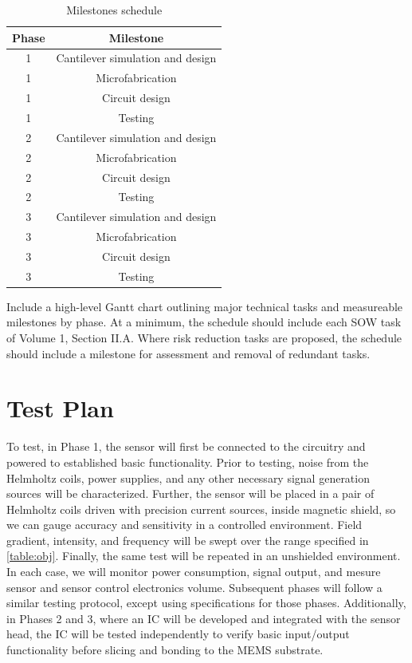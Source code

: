 \begin{table}[h!]
\centering
  \begin{tabular}{|c||c|}
    \hline
    Phase & Milestone \\
    \hline
    \hline
    1 & Cantilever simulation and design \\
    \hline
    1 & Microfabrication \\
    \hline
    1 & Circuit design \\
    \hline
    1 & Testing \\
    \hline
    \hline
    2 & Cantilever simulation and design \\
    \hline
    2 & Microfabrication \\
    \hline
    2 & Circuit design \\
    \hline
    2 & Testing \\
    \hline
    \hline
    3 & Cantilever simulation and design \\
    \hline
    3 & Microfabrication \\
    \hline
    3 & Circuit design \\
    \hline
    3 & Testing \\
    \hline
  \end{tabular}
\caption{Milestones schedule}
\label{table:sched}
\end{table}

Include a high-level Gantt chart outlining major technical tasks and measureable milestones
by phase. At a minimum, the schedule should include each SOW task of Volume 1, Section
II.A. Where risk reduction tasks are proposed, the schedule should include a milestone for
assessment and removal of redundant tasks.

\section{Test Plan}\label{sec:test}

To test, in Phase 1, the sensor will first be connected to the circuitry and powered to established basic functionality.  Prior to testing, noise from the Helmholtz coils, power supplies, and any other necessary signal generation sources will be characterized. Further, the sensor will be placed in a pair of Helmholtz coils driven with precision current sources, inside magnetic shield, so we can gauge accuracy and sensitivity in a controlled environment. Field gradient, intensity, and frequency will be swept over the range specified in \ref{table:obj}. Finally, the same test will be repeated in an unshielded environment. In each case, we will monitor power consumption, signal output, and mesure sensor and sensor control electronics volume. Subsequent phases will follow a similar testing protocol, except using specifications for those phases. Additionally, in Phases 2 and 3, where an IC will be developed and integrated with the sensor head, the IC will be tested independently to verify basic input/output functionality before slicing and bonding to the MEMS substrate.

